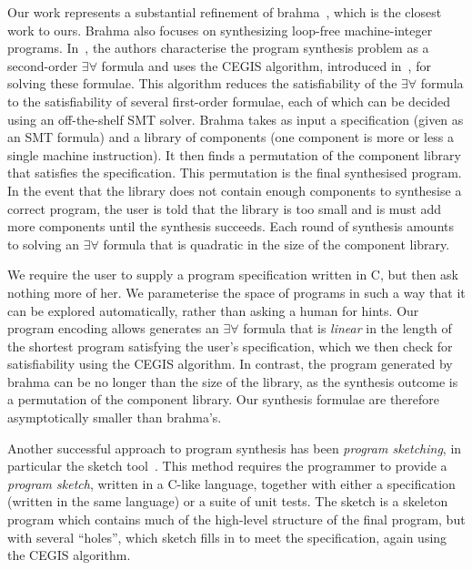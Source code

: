 \documentclass[a4paper]{llncs}
\begin{document}
Our work represents a substantial refinement of {\sc brahma}~\cite{brahma},
which is the closest work to ours.  {\sc Brahma} also focuses on
synthesizing loop-free machine-integer programs.  In~\cite{brahma}, the
authors characterise the program synthesis problem as a second-order
$\exists \forall$ formula and uses the CEGIS algorithm,
introduced in~\cite{lezama-thesis}, for solving
these formulae.  This algorithm reduces the satisfiability of the $\exists
\forall$ formula to the satisfiability of several first-order formulae, each
of which can be decided using an off-the-shelf SMT solver.  {\sc Brahma}
takes as input a specification (given as an SMT formula) and a library of
components (one component is more or less a single machine instruction).  It
then finds a permutation of the component library that satisfies the
specification.  This permutation is the final synthesised program.  In the
event that the library does not contain enough components to synthesise a
correct program, the user is told that the library is too small and is
must add more components until the synthesis succeeds.  Each round of
synthesis amounts to solving an $\exists \forall$ formula that is quadratic
in the size of the component library.

We require the user to supply a program specification written in C, but then
ask nothing more of her.  We parameterise the space of programs in such a way
that it can be explored automatically, rather than asking a human for hints.
Our program encoding allows generates an $\exists
\forall$ formula that is \emph{linear} in the length of the shortest program
satisfying the user's specification, which we then check for satisfiability
using the CEGIS algorithm.  In contrast, the program generated by {\sc
brahma} can be no longer than the size of the library, as the synthesis
outcome is a permutation of the component library.  Our synthesis
formulae are therefore asymptotically smaller than {\sc brahma}'s.

Another successful approach to program synthesis has been \emph{program
sketching}, in particular the {\sc sketch} tool~\cite{lezama-thesis,sketch}.  This method
requires the programmer to provide a \emph{program sketch}, written in a
C-like language, together with either a specification (written in the same
language) or a suite of unit tests.  The sketch is a skeleton program which
contains much of the high-level structure of the final program, but with
several ``holes'', which {\sc sketch} fills in to meet the specification,
again using the CEGIS algorithm.
\end{document}
